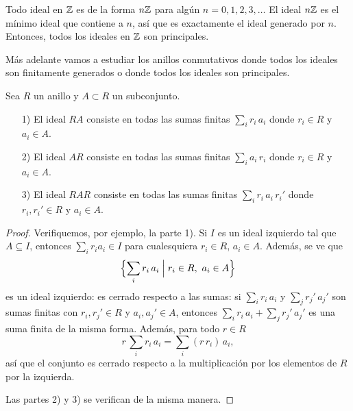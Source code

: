 \begin{ejemplo}
  Todo ideal en $\mathbb{Z}$ es de la forma $n\mathbb{Z}$ para algún $n = 0,1,2,3,\ldots$
  El ideal $n\mathbb{Z}$ es el mínimo ideal que contiene a $n$, así que es exactamente
  el ideal generado por $n$. Entonces, todos los ideales en $\mathbb{Z}$
  son principales.
\end{ejemplo}

Más adelante vamos a estudiar los anillos conmutativos donde todos los ideales
son finitamente generados o donde todos los ideales son principales.

\begin{observacion}
  Sea $R$ un anillo y $A \subset R$ un subconjunto.

  \begin{enumerate}
  \item[1)] El ideal $RA$ consiste en todas las sumas finitas $\sum_i r_i\,a_i$
    donde $r_i\in R$ y $a_i \in A$.

  \item[2)] El ideal $AR$ consiste en todas las sumas finitas $\sum_i a_i\,r_i$
    donde $r_i\in R$ y $a_i \in A$.

  \item[3)] El ideal $RAR$ consiste en todas las sumas finitas
    $\sum_i r_i\,a_i\,r_i'$ donde $r_i,r_i'\in R$ y $a_i \in A$.
  \end{enumerate}

  \begin{proof}
    Verifiquemos, por ejemplo, la parte 1). Si $I$ es un ideal izquierdo tal que
    $A \subseteq I$, entonces $\sum_i r_i a_i \in I$ para cualesquiera
    $r_i \in R$, $a_i \in A$. Además, se ve que
    $$\Bigl\{ \sum_i r_i\,a_i \Bigm| r_i \in R, ~ a_i \in A \Bigr\}$$
    es un ideal izquierdo: es cerrado respecto a las sumas: si $\sum_i r_i\,a_i$
    y $\sum_j r_j'\,a_j'$ son sumas finitas con $r_i, r_j' \in R$ y
    $a_i, a_j' \in A$, entonces $\sum_i r_i\,a_i + \sum_j r_j'\,a_j'$ es una
    suma finita de la misma forma. Además, para todo $r\in R$
    $$r\,\sum_i r_i\,a_i = \sum_i (r\,r_i)\,a_i,$$
    así que el conjunto es cerrado respecto a la multiplicación por
    los elementos de $R$ por la izquierda.

    Las partes 2) y 3) se verifican de la misma manera.
  \end{proof}
\end{observacion}

